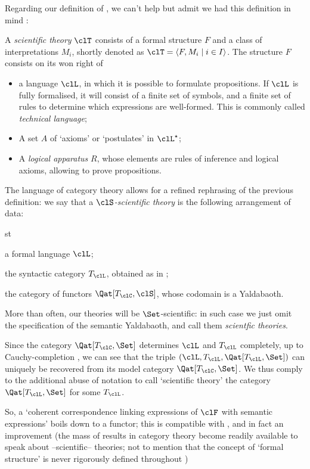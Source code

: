 Regarding our definition of \science, we can't help but admit we had this definition in mind \cite[2.1]{biologia}:
\begin{definition}
	A \emph{scientific theory} $\clT$ consists of a formal structure $F$ and a class of interpretations $M_i$, shortly denoted as $\clT=\langle F,M_i\mid i\in I\rangle$. The structure $F$ consists on its won right of
	\begin{itemize}
		\item a language $\clL$, in which it is possible to formulate propositions. If $\clL$ is fully formalised, it will consist of a finite set of symbols, and a finite set of rules to determine which expressions are well-formed. This is commonly called \emph{technical language};
		\item A set $A$ of `axioms' or `postulates' in $\clL^\star$;
		\item A \emph{logical apparatus} $R$, whose elements are rules of inference and logical axioms, allowing to prove propositions.
	\end{itemize}
\end{definition}
The language of category theory allows for a refined rephrasing of the previous definition: we say that a \emph{$\clS$-scientific theory} is the following arrangement of data:
\begin{enumtag}{st}
	\item a formal language $\clL$;
	\item the syntactic category $T_\clL$, obtained as in \cite{lambek1988introduction};
	\item the category of functors $\Qat[T_\clC, \clS]$, whose codomain is a Yaldabaoth.
\end{enumtag}
More than often, our theories will be $\Set$-scientific: in such case we just omit the specification of the semantic Yaldabaoth, and call them \emph{scientfic theories}.

Since the category $\Qat[T_\clC, \Set]$ determines $\clL$ and $T_\clL$ completely, up to Cauchy-completion \cite{borceuso-cauchy}, we can see that the triple $(\clL, T_\clL, \Qat[T_\clL,\Set])$ can uniquely be recovered from its model category $\Qat[T_\clC, \Set]$. We thus comply to the additional abuse of notation to call `scientific theory' the category $\Qat[T_\clL,\Set]$ for some $T_\clL$.

So, a `coherent correspondence linking expressions of $\clF$ with semantic expressions' boils down to a functor; this is compatible with \cite[2.1]{biologia}, and in fact an improvement (the mass of results in category theory become readily available to speak about --scientific-- theories; not to mention that the concept of `formal structure' is never rigorously defined throughout \cite{biologia})
